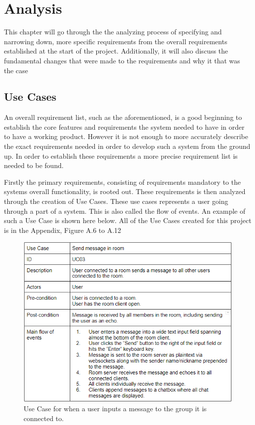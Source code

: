\chapter{Analysis}
This chapter will go through the the analyzing process of specifying and narrowing down, more specific requirements from the overall requirements established at the start of the project.  Additionally, it will also discuss the fundamental changes that were made to the requirements and why it that was the case

\section{Use Cases}
An overall requirement list, such as the aforementioned, is a good beginning to establish the core features and requirements the system needed to have in order to have a working product. However it is not enough to more accurately describe the exact requirements needed in order to develop such a system from the ground up.  In order to establish these requirements a more precise requirement list is needed to be found. 

Firstly the primary requirements, consisting of requirements mandatory to the systems overall functionality, is rooted out. These requirements is then analyzed through the creation of Use Cases. These use cases represents a user going through a part of a system. This is also called the flow of events. An example of such a Use Case is shown here below. All of the Use Cases created for this project is in the Appendix, Figure A.6 to A.12
\begin{figure}[ht]
    \centering
    \includegraphics[width=\textwidth]{Pictures/UseCaseSendMessage.png}
    \caption{Use Case for when a user inputs a message to the group it is connected to.}
    \label{fig:gantt}
\end{figure}

